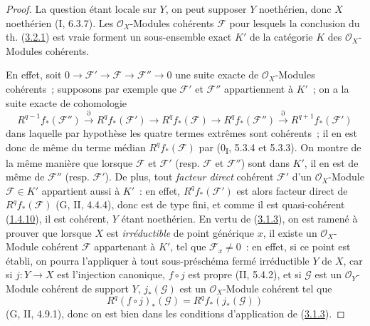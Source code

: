 \begin{proof}
La question étant locale sur $Y$, on peut supposer $Y$ noethérien, donc $X$
noethérien (I, 6.3.7). Les $\mathcal O_X$-Modules cohérents $\mathcal F$ pour
lesquels la conclusion du th. (\hyperref[III.3.2.1-fr]{3.2.1}) est vraie
forment un sous-ensemble exact $K'$ de la catégorie $K$ des
$\mathcal O_X$-Modules cohérents.

En effet, soit
$0\to\mathcal F'\to\mathcal F\to\mathcal F''\to0$ une suite exacte de
$\mathcal O_X$-Modules cohérents~; supposons par exemple que $\mathcal F'$
et $\mathcal F''$ appartiennent à $K'$~; on a la suite exacte de cohomologie
\[
R^{q-1}f_*(\mathcal F'')\xrightarrow{\partial}R^qf_*(\mathcal F')
\longrightarrow R^qf_*(\mathcal F)\longrightarrow R^qf_*(\mathcal F'')
\xrightarrow{\partial}R^{q+1}f_*(\mathcal F')
\]
dans laquelle par hypothèse les quatre termes extrêmes sont cohérents~; il
en est donc de même du terme médian $R^qf_*(\mathcal F)$ par
(0\textsubscript{I}, 5.3.4 et 5.3.3). On montre de la même manière que
lorsque $\mathcal F$ et $\mathcal F'$ (resp. $\mathcal F$ et
$\mathcal F''$) sont dans $K'$, il en est de même de $\mathcal F''$ (resp.
$\mathcal F'$). De plus, tout \emph{facteur direct} cohérent $\mathcal F'$
d'un $\mathcal O_X$-Module $\mathcal F\in K'$ appartient aussi à $K'$~: en
effet, $R^qf_*(\mathcal F')$ est alors facteur direct de
$R^qf_*(\mathcal F)$ (G, II, 4.4.4), donc est de type fini, et comme il est
quasi-cohérent (\hyperref[III.1.4.10-fr]{1.4.10}), il est cohérent, $Y$
étant noethérien. En vertu de (\hyperref[III.3.1.3-fr]{3.1.3}), on est
ramené à prouver que lorsque $X$ est \emph{irréductible} de point générique
$x$, il existe un $\mathcal O_X$-Module cohérent $\mathcal F$ appartenant à
$K'$, tel que $\mathcal F_x\neq0$~: en effet, si ce point est établi, on
pourra l'appliquer à tout sous-préschéma fermé irréductible $Y$ de $X$, car
si $j:Y\to X$ est l'injection canonique, $f\circ j$ est propre (II, 5.4.2),
et si $\mathcal G$ est un $\mathcal O_Y$-Module cohérent de support $Y$,
$j_*(\mathcal G)$ est un $\mathcal O_X$-Module cohérent tel que
\[
R^q(f\circ j)_*(\mathcal G)=R^qf_*(j_*(\mathcal G))
\]
(G, II, 4.9.1), donc on est bien dans les conditions d'application de
(\hyperref[III.3.1.3-fr]{3.1.3}).


\end{proof}
